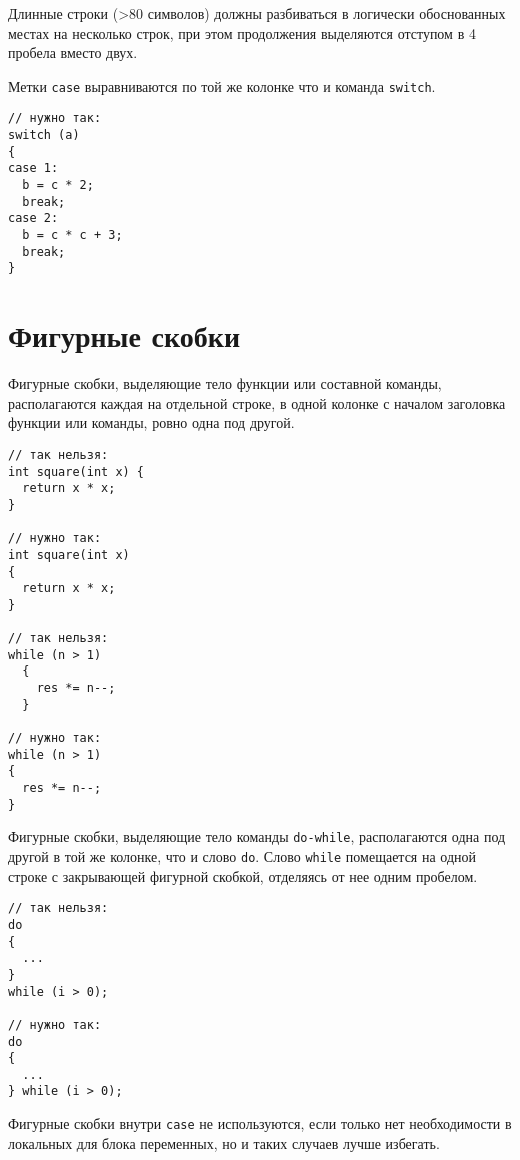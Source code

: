\zzstyleitem

Длинные строки (\textgreater{}80 символов) должны разбиваться в
логически обоснованных местах на несколько строк, при этом продолжения
выделяются отступом в 4 пробела вместо двух.

\zzstyleitem

Метки \texttt{case} выравниваются по той же колонке что и команда
\texttt{switch}.

\begin{verbatim}
// нужно так:
switch (a)
{
case 1:
  b = c * 2;
  break;
case 2:
  b = c * c + 3;
  break;
}
\end{verbatim}


\section{Фигурные скобки}


\zzstyleitem

Фигурные скобки, выделяющие тело функции или составной команды,
располагаются каждая на отдельной строке, в одной колонке с началом
заголовка функции или команды, ровно одна под другой.

\begin{verbatim}
// так нельзя:
int square(int x) {
  return x * x; 
}

// нужно так:
int square(int x)
{
  return x * x;
}

// так нельзя:
while (n > 1)
  {
    res *= n--;
  }

// нужно так:
while (n > 1)
{
  res *= n--;
}
\end{verbatim}

\zzstyleitem

Фигурные скобки, выделяющие тело команды \texttt{do-while},
располагаются одна под другой в той же колонке, что и слово \texttt{do}.
Слово \texttt{while} помещается на одной строке с закрывающей фигурной
скобкой, отделяясь от нее одним пробелом.

\begin{verbatim}
// так нельзя:
do
{
  ...
}
while (i > 0);

// нужно так:
do
{
  ...
} while (i > 0);
\end{verbatim}

\zzstyleitem

Фигурные скобки внутри \texttt{case} не используются, если только нет
необходимости в локальных для блока переменных, но и таких случаев лучше
избегать.

